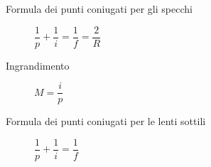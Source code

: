\documentclass[a4paper,11pt,italian]{article}
\begin{document}
\begin{description}
  \item[Formula dei punti coniugati per gli specchi] $ \dfrac{1}{p} +\dfrac{1}{i} = \dfrac{1}{f} = \dfrac{2}{R} $
  
  \item[Ingrandimento] $ M = \dfrac{i}{p} $
  
  \item[Formula dei punti coniugati per le lenti sottili] $ \dfrac{1}{p} +\dfrac{1}{i} = \dfrac{1}{f} $
%   
%   

%   
  
%   
%   


\end{description}
\end{document}
